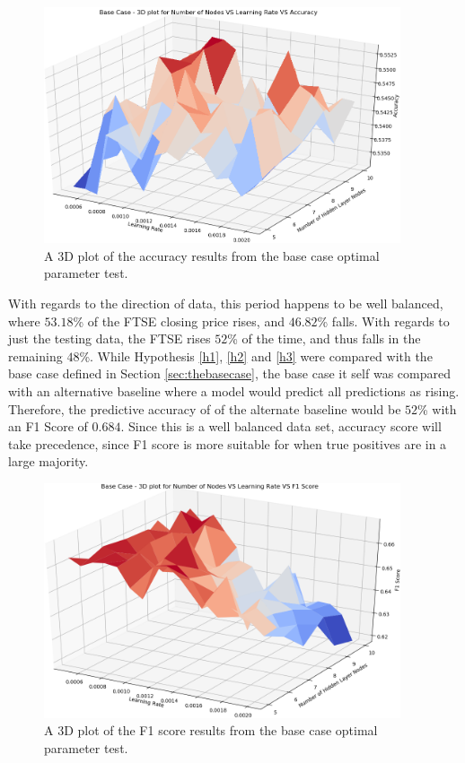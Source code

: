 \documentclass{UoYCSproject}
\begin{document}
\begin{figure}[h]
\includegraphics[width=10.5cm]{base_accuracy.png}
\centering
\caption{A 3D plot of the accuracy results from the base case optimal parameter test.} 
\label{fig:base_plot_accuracy}
\end{figure}

With regards to the direction of data, this period happens to be well balanced, where $53.18$\% of the FTSE closing price rises, and $46.82$\% falls. With regards to just the testing data, the FTSE rises $52$\% of the time, and thus falls in the remaining $48$\%. While Hypothesis \ref{h1}, \ref{h2} and \ref{h3} were compared with the base case defined in Section \ref{sec:thebasecase}, the base case it self was compared with an alternative baseline where a model would predict all predictions as rising. Therefore, the predictive accuracy of of the alternate baseline would be $52$\% with an F1 Score of $0.684$. Since this is a well balanced data set, accuracy score will take precedence, since F1 score is more suitable for when true positives are in a large majority.

\begin{figure}[h]
\includegraphics[width=10.5cm]{base_f1.png}
\centering
\caption{A 3D plot of the F1 score results from the base case optimal parameter test.} 
\label{fig:base_plot_f1}
\end{figure}
\end{document}
